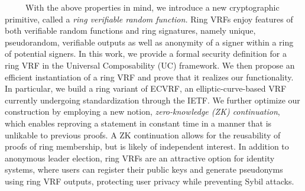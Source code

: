 ~~~~~With the above properties in mind, we introduce a new cryptographic primitive, called a 
\emph{ring verifiable random function.}
Ring VRFs enjoy features of both verifiable random functions and ring signatures, namely unique, pseudorandom, verifiable outputs as well as anonymity of a signer within a ring of potential signers.
In this work, we provide a formal security definition for a ring VRF in the Universal Composability (UC) framework.
We then propose an efficient instantiation of a ring VRF and prove that it realizes our functionality.
In particular, we build a ring variant of ECVRF, an elliptic-curve-based VRF currently undergoing standardization through the IETF.
We further optimize our construction by employing a new notion, \emph{zero-knowledge (ZK) continuation}, which enables reproving a statement in constant time in a manner that is unlikable to previous proofs.
A ZK continuation allows for the reusability of proofs of ring membership, but is likely of independent interest.
In addition to anonymous leader election, ring VRFs are an attractive option for identity systems, where users can register their public keys and generate pseudonyms using ring VRF outputs, protecting user privacy while preventing Sybil attacks.


